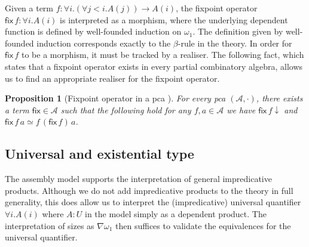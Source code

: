 \documentclass[10pt,a4paper]{article}
\newtheorem{proposition}[theorem]{Proposition}
\theoremstyle{definition}
\theoremstyle{remark}
\renewcommand{\.}{.\,} %
\renewcommand{\:}{:} %
\newcommand{\fix}{\mathsf{fix}}
\newcommand{\0}{\mathbf{0}}
\newcommand{\1}{\mathbf{1}}
\newcommand\<\langle
\renewcommand\>\rangle
\newcommand{\cA}{\mathcal{A}}
\theoremstyle{remark}
\begin{document}
Given a term \( f : \forall i. (\forall j < i. A(j)) \to A(i) \), the fixpoint operator \( \fix \, f : \forall i . A(i) \) is interpreted as a morphism, where the underlying dependent function is defined by well-founded induction on \( \omega_1 \). The definition given by well-founded induction corresponds exactly to the \( \beta \)-rule in the theory. In order for \( \fix \, f \) to be a morphism, it must be tracked by a realiser. The following fact, which states that a fixpoint operator exists in every partial combinatory algebra, allows us to find an appropriate realiser for the fixpoint operator.
\begin{proposition}[Fixpoint operator in a pca \cite{oosten}]
    For every pca $(\cA, \cdot)$, there exists a term $\fix\! \in \cA$ such that the following hold for any \( f, a \in \cA \) we have $\fix\,f \downarrow$ and $\fix\,f \, a \simeq f \, (\fix\,f) \, a$.
\end{proposition}


\subsection{Universal and existential type}
The assembly model supports the interpretation of general impredicative products. Although we do not add impredicative products to the theory in full generality, this does allow us to interpret the (impredicative) universal quantifier $\forall i . A(i)$ where $A : U$ in the model simply as a dependent product. The interpretation of sizes as $\nabla \omega_1$ then suffices to validate the equivalences for the universal quantifier.
\end{document}
